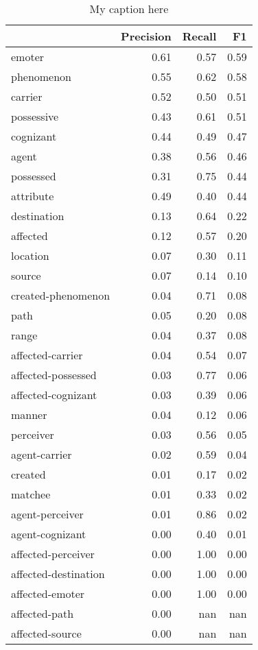 \begin{table}[!ht]
\centering
\begin{tabular}{lrrr}
\toprule
{} &  Precision &  Recall &   F1 \\
\midrule
emoter               &       0.61 &    0.57 & 0.59 \\
phenomenon           &       0.55 &    0.62 & 0.58 \\
carrier              &       0.52 &    0.50 & 0.51 \\
possessive           &       0.43 &    0.61 & 0.51 \\
cognizant            &       0.44 &    0.49 & 0.47 \\
agent                &       0.38 &    0.56 & 0.46 \\
possessed            &       0.31 &    0.75 & 0.44 \\
attribute            &       0.49 &    0.40 & 0.44 \\
destination          &       0.13 &    0.64 & 0.22 \\
affected             &       0.12 &    0.57 & 0.20 \\
location             &       0.07 &    0.30 & 0.11 \\
source               &       0.07 &    0.14 & 0.10 \\
created-phenomenon   &       0.04 &    0.71 & 0.08 \\
path                 &       0.05 &    0.20 & 0.08 \\
range                &       0.04 &    0.37 & 0.08 \\
affected-carrier     &       0.04 &    0.54 & 0.07 \\
affected-possessed   &       0.03 &    0.77 & 0.06 \\
affected-cognizant   &       0.03 &    0.39 & 0.06 \\
manner               &       0.04 &    0.12 & 0.06 \\
perceiver            &       0.03 &    0.56 & 0.05 \\
agent-carrier        &       0.02 &    0.59 & 0.04 \\
created              &       0.01 &    0.17 & 0.02 \\
matchee              &       0.01 &    0.33 & 0.02 \\
agent-perceiver      &       0.01 &    0.86 & 0.02 \\
agent-cognizant      &       0.00 &    0.40 & 0.01 \\
affected-perceiver   &       0.00 &    1.00 & 0.00 \\
affected-destination &       0.00 &    1.00 & 0.00 \\
affected-emoter      &       0.00 &    1.00 & 0.00 \\
affected-path        &       0.00 &     nan &  nan \\
affected-source      &       0.00 &     nan &  nan \\
\bottomrule
\end{tabular}
\caption{My caption here}
\label{tab:PARTICIPANT_ROLE-oe-combined-F1}
\end{table}